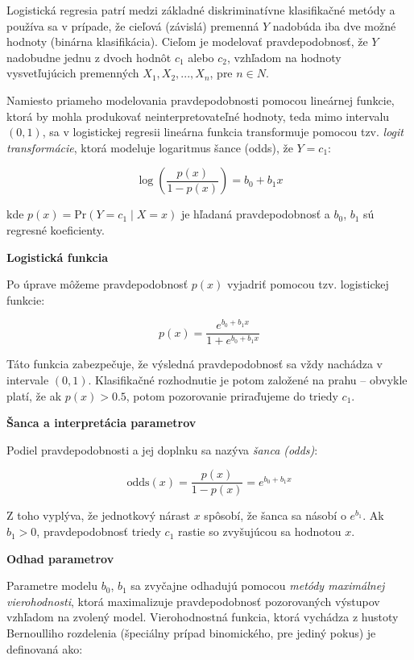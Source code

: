 Logistická regresia patrí medzi základné diskriminatívne klasifikačné metódy a používa sa v prípade, že cieľová (závislá) premenná $Y$ nadobúda iba dve možné hodnoty (binárna klasifikácia). Cieľom je modelovať pravdepodobnosť, že $Y$ nadobudne jednu z dvoch hodnôt $c_1$ alebo $c_2$, vzhľadom na hodnoty vysvetľujúcich premenných $X_1, X_2, ..., X_n$, pre $n \in N$.

Namiesto priameho modelovania pravdepodobnosti pomocou lineárnej funkcie, ktorá by mohla produkovať neinterpretovateľné hodnoty, teda mimo intervalu $(0,1)$, sa v logistickej regresii lineárna funkcia transformuje pomocou tzv. \textit{logit transformácie}, ktorá modeluje logaritmus šance (odds), že $Y = c_1$:

\begin{equation}
\log\left( \frac{p(x)}{1 - p(x)} \right) = b_0 + b_1 x
\end{equation}

kde $p(x) = \mathrm{Pr}(Y=c_1\mid X=x)$ je hľadaná pravdepodobnosť a $b_0$, $b_1$ sú regresné koeficienty.

\textbf{Logistická funkcia}

Po úprave môžeme pravdepodobnosť $p(x)$ vyjadriť pomocou tzv. logistickej funkcie:

\begin{equation}
p(x) = \frac{e^{b_0 + b_1 x}}{1 + e^{b_0 + b_1 x}}
\end{equation}

Táto funkcia zabezpečuje, že výsledná pravdepodobnosť sa vždy nachádza v intervale $(0,1)$. Klasifikačné rozhodnutie je potom založené na prahu – obvykle platí, že ak $p(x) > 0.5$, potom pozorovanie priraďujeme do triedy $c_1$.

\textbf{Šanca a interpretácia parametrov}

Podiel pravdepodobnosti a jej doplnku sa nazýva \textit{šanca (odds)}:

\begin{equation}
\text{odds}(x) = \frac{p(x)}{1 - p(x)} = e^{b_0 + b_1 x}
\end{equation}

Z toho vyplýva, že jednotkový nárast $x$ spôsobí, že šanca sa násobí o $e^{b_1}$. Ak $b_1 > 0$, pravdepodobnosť triedy $c_1$ rastie so zvyšujúcou sa hodnotou $x$.

\textbf{Odhad parametrov}

Parametre modelu $b_0$, $b_1$ sa zvyčajne odhadujú pomocou \textit{metódy maximálnej vierohodnosti}, ktorá maximalizuje pravdepodobnosť pozorovaných výstupov vzhľadom na zvolený model. Vierohodnostná funkcia, ktorá vychádza z hustoty Bernoulliho rozdelenia (špeciálny prípad binomického, pre jediný pokus) je definovaná ako:

